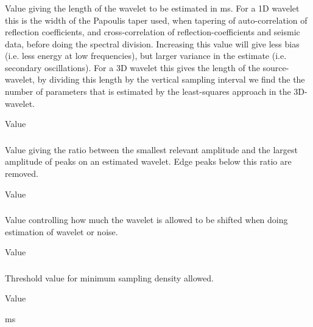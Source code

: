 \subsubsection{}
 \slist
   \item \Description Value giving the length of the wavelet to be estimated in ms. For a 1D wavelet this is the width of the Papoulis taper used, when
tapering of auto-correlation of reflection coefficients, and cross-correlation of reflection-coefficients and seismic data,
before doing the spectral division.  Increasing this value will give less bias (i.e. less energy at low frequencies), but larger
variance in the estimate (i.e. secondary oscillations).   For a 3D wavelet this gives the length of the source-wavelet, by dividing this length by
the vertical sampling interval we find the the number of parameters that is estimated  by the least-squares approach in the 3D-wavelet.
   \item \Argument Value
   \item {}
 \elist

\subsubsection{}
 \slist
   \item \Description Value giving the ratio between the smallest relevant amplitude and the largest amplitude of peaks on an estimated wavelet. Edge peaks below this ratio are removed.
   \item \Argument Value
   \item {}
 \elist

\subsubsection{}
 \slist
   \item \Description Value controlling how much the wavelet is allowed to be shifted when doing estimation of wavelet or noise.
   \item \Argument Value
   \item {}
 \elist

\subsubsection{}
 \slist
   \item \Description Threshold value for minimum sampling density allowed.
   \item \Argument Value
   \item {} ms
 \elist


